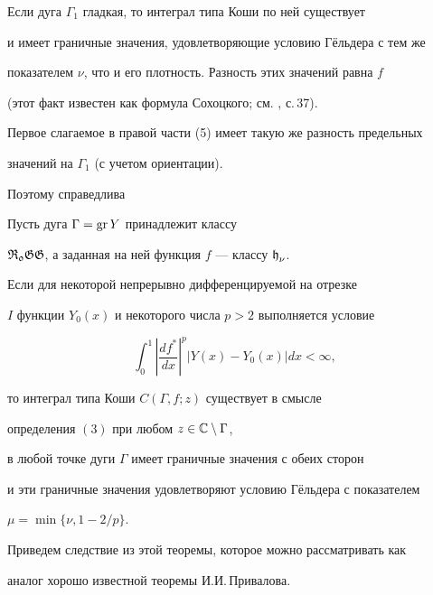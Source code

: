 Если дуга $\Gamma_1$ гладкая, то интеграл типа Коши по ней существует


и имеет граничные значения, удовлетворяющие условию Г\"ельдера с тем же


показателем $\nu$, что и его плотность. Разность этих значений равна $f$


(этот факт известен как формула Сохоцкого; см. \cite{Ga}, с.\,37).


Первое слагаемое в правой части (5) имеет такую же разность предельных


значений на $\Gamma_1$ (с учетом ориентации).





Поэтому справедлива





\begin{thm} Пусть дуга $\Gamma = \operatorname{gr} Y$ принадлежит классу


$\operatorname{\frak {R_{0}GG}}$, а заданная на ней функция $f$ --- классу $\operatorname{\frak h}_{\nu}$.


Если для некоторой непрерывно дифференцируемой на отрезке


$I$ функции $Y_{0}(x)$ и некоторого числа $p>2$ выполняется условие


$$


\int_{0}^{1}{\left|\frac{df^*}{dx}\right|^{p}


\left|Y(x) - Y_{0}(x)\right|dx} < \infty,


$$


то интеграл типа Коши $C(\Gamma, f;z)$ существует в смысле


определения $(3)$ при любом $z\in {\Bbb C}\setminus\Gamma$,


в любой точке дуги $\Gamma$ имеет граничные значения с обеих сторон


и эти граничные значения удовлетворяют условию Г\"ельдера с показателем


$\mu = \min\{\nu, 1-2/p\}$.


\end{thm}





Приведем следствие из этой теоремы, которое можно рассматривать как


аналог хорошо известной теоремы И.И.\,Привалова.


\medskip





